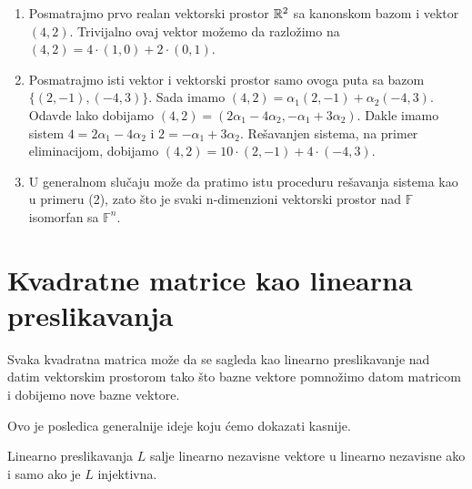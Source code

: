 \documentclass{article}
\begin{document}
\begin{example}
  \begin{enumerate}
    \item Posmatrajmo prvo realan vektorski prostor $\mathbb{R}^2$ sa kanonskom bazom i vektor $(4, 2)$.
      Trivijalno ovaj vektor možemo da razložimo na $(4, 2) = 4 \cdot (1, 0) + 2 \cdot (0, 1)$.
    \item Posmatrajmo isti vektor i vektorski prostor samo ovoga puta sa bazom $\{(2, -1), (-4, 3)\}$.
      Sada imamo $(4, 2) = \alpha_1 (2, -1) + \alpha_2 (-4, 3)$.
      Odavde lako dobijamo $(4, 2) = (2 \alpha_1 - 4 \alpha_2, -\alpha_1 + 3 \alpha_2)$.
      Dakle imamo sistem $4 = 2 \alpha_1 - 4 \alpha_2$ i $2 = -\alpha_1 + 3 \alpha_2$.
      Rešavanjen sistema, na primer eliminacijom, dobijamo $(4, 2) = 10 \cdot (2, -1) + 4 \cdot (-4, 3)$.
    \item U generalnom slučaju može da pratimo istu proceduru rešavanja sistema kao u primeru (2), zato što je svaki n-dimenzioni vektorski prostor nad $\mathbb{F}$ isomorfan sa $\mathbb{F}^n$.
  \end{enumerate}
\end{example}

\section{Kvadratne matrice kao linearna preslikavanja}

\begin{theorem}
  Svaka kvadratna matrica može da se sagleda kao linearno preslikavanje nad datim vektorskim prostorom tako što bazne vektore pomnožimo datom matricom i dobijemo nove bazne vektore.
\end{theorem}

Ovo je posledica generalnije ideje koju ćemo dokazati kasnije.

\begin{theorem}
  Linearno preslikavanja $L$ salje linearno nezavisne vektore u linearno nezavisne ako i samo ako je $L$ injektivna.
\end{theorem}
\end{document}
